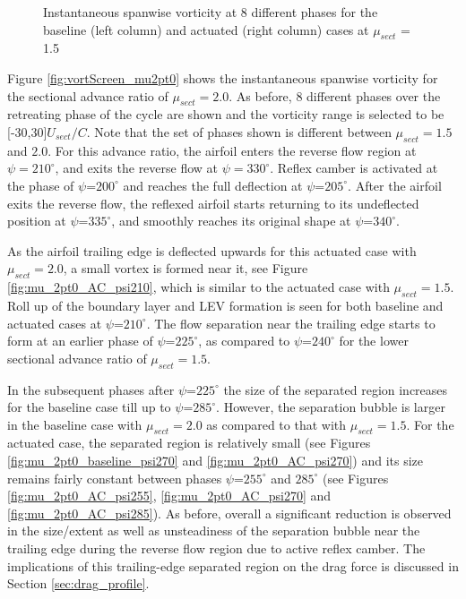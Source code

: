 \begin{figure}[H]
	
	
	\caption{Instantaneous spanwise vorticity at 8 different phases for the baseline (left column) and actuated (right column) cases at $\mu_{sect}$ = 1.5}
	\label{fig:vortScreen_mu1pt5}
\end{figure}



Figure \ref{fig:vortScreen_mu2pt0} shows the instantaneous spanwise vorticity for the sectional advance ratio of $\mu_{sect}=2.0$.
As before, 8 different phases over the retreating phase of the cycle are shown and the vorticity range is selected to be [-30,30]$ U_{sect} /C$. Note that the set of phases shown is different between $\mu_{sect}=1.5$ and $2.0$. For this advance ratio, the airfoil enters the reverse flow region at $\psi=210^\circ$, and exits the reverse flow at $\psi=330^\circ$.
Reflex camber is activated at the phase of $\psi$=$200^\circ$ and reaches the full deflection at $\psi$=$205^\circ$.
After the airfoil exits the reverse flow, the reflexed airfoil starts returning to its undeflected position at $\psi$=$335^\circ$, and smoothly reaches its original shape at $\psi$=$340^\circ$.

As the airfoil trailing edge is deflected upwards for this actuated case with $\mu_{sect}=2.0$, a small vortex is formed near it, see Figure \ref{fig:mu_2pt0_AC_psi210}, which is similar to the actuated case with $\mu_{sect}=1.5$. Roll up of the boundary layer and LEV formation is seen for both baseline and actuated cases at $\psi$=$210^\circ$.
The flow separation near the trailing edge starts to form at an earlier phase of $\psi$=$225^\circ$, as compared to $\psi$=$240^\circ$ for the lower sectional advance ratio of $\mu_{sect}=1.5$.

In the subsequent phases after $\psi$=$225^\circ$ the size of the separated region increases for the baseline case till up to $\psi$=$285^\circ$. However, the separation bubble is larger in the baseline case with $\mu_{sect}=2.0$ as compared to that with $\mu_{sect}=1.5$.
For the actuated case, the separated region is relatively small (see Figures \ref{fig:mu_2pt0_baseline_psi270} and \ref{fig:mu_2pt0_AC_psi270}) and its size remains fairly constant between phases $\psi$=$255^\circ$ and $285^\circ$ (see Figures \ref{fig:mu_2pt0_AC_psi255}, \ref{fig:mu_2pt0_AC_psi270} and \ref{fig:mu_2pt0_AC_psi285}).
As before, overall a significant reduction is observed in the size/extent as well as unsteadiness of the separation bubble near the trailing edge during the reverse flow region due to active reflex camber.
The implications of this trailing-edge separated region on the drag force is discussed in Section \ref{sec:drag_profile}.

